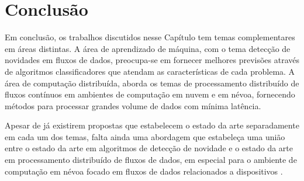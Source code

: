 
\newcommand{\stream}{\emph{data stream}\xspace}
\newcommand{\streams}{\emph{data streams}\xspace}
\newcommand{\streamMining}{\emph{data stream mining}\xspace}

\section{Conclusão}\label{sec:conclusao-relacionados}


Em conclusão, os trabalhos discutidos nesse Capítulo tem temas complementares em
áreas distintas.
A área de aprendizado de máquina, com o tema detecção de novidades em fluxos de
dados, preocupa-se em fornecer melhores previsões através de algoritmos
classificadores que atendam as características de cada problema.
A área de computação distribuída, aborda os temas de processamento distribuído
de fluxos contínuos em ambientes de computação em nuvem e em névoa, fornecendo
métodos para processar grandes volume de dados com mínima latência.

Apesar de já existirem propostas que estabelecem o estado da arte separadamente
em cada um dos temas, falta ainda uma abordagem que estabeleça uma união entre o
estado da arte em algoritmos de detecção de novidade e o estado da arte em
processamento distribuído de fluxos de dados, em especial para o ambiente de
computação em névoa focado em fluxos de dados relacionados a dispositivos \iot.

